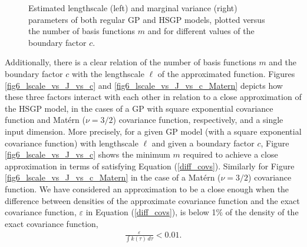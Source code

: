 \documentclass[]{interact}
\theoremstyle{plain}%
\theoremstyle{definition}
\theoremstyle{remark}
\begin{document}
\begin{figure}
\caption{Estimated lengthscale (left) and marginal variance (right) parameters of both regular GP and HSGP models, plotted versus the number of basis functions $m$ and for different values of the boundary factor $c$.}
  \label{fig5_lscale_vs_J}
\end{figure}


Additionally, there is a clear relation of the number of basis functions $m$ and the boundary factor $c$ with the lengthscale $\ell$ of the approximated function. Figures \ref{fig6_lscale_vs_J_vs_c} and \ref{fig6_lscale_vs_J_vs_c_Matern} depicts how these three factors interact with each other in relation to 
a close approximation of the HSGP model, in the cases of a GP with square exponential covariance function and Mat\'ern ($\nu=3/2$) covariance function, respectively, and a single input dimension. More precisely, for a given GP model (with a square exponential covariance function) with lengthscale $\ell$ and given a boundary factor $c$, Figure \ref{fig6_lscale_vs_J_vs_c} shows the minimum $m$ required to achieve a close approximation in terms of satisfying Equation (\ref{diff_covs}). Similarly for Figure \ref{fig6_lscale_vs_J_vs_c_Matern} in the case of a Mat\'ern ($\nu=3/2$) covariance function. We have considered an approximation to be a close enough when the difference between densities of the approximate covariance function and the exact covariance function, $\varepsilon$ in Equation (\ref{diff_covs}), is below 1$\%$ of the density of the exact covariance function,
%
\begin{eqnarray*}
 \frac{\varepsilon}{\int k(\tau) \, d\tau} < 0.01.
\end{eqnarray*}
\end{document}
